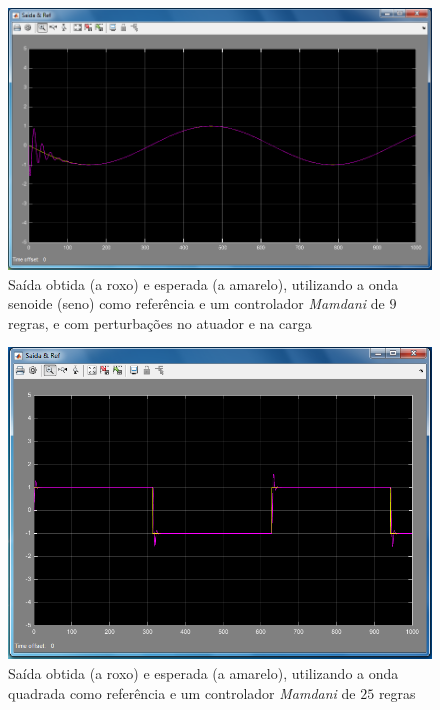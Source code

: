 \documentclass{article}
\begin{document}
\begin{figure}[h]
  \centering
      \includegraphics[scale=0.3]{Images/Mamdani_9_sin_actuator_charge.png}
  \caption{Saída obtida (a roxo) e esperada (a amarelo), utilizando a onda senoide (seno) como referência e um controlador \emph{Mamdani} de $9$ regras, e com perturbações no atuador e na carga}
\end{figure}


\begin{figure}[h]
  \centering
      \includegraphics[scale=0.3]{Images/Mamdani_25_square.png}
  \caption{Saída obtida (a roxo) e esperada (a amarelo), utilizando a onda quadrada como referência e um controlador \emph{Mamdani} de $25$ regras}
\end{figure}
\end{document}
